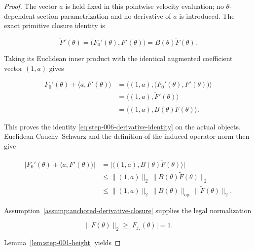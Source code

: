 \begin{proof}
The vector \(a\) is held fixed in this pointwise velocity evaluation; no
\(\theta\)-dependent section parametrization and no derivative of \(a\) is introduced. The exact primitive
closure identity is

\begin{equation}
\label{eq:appendix-display-186}
\widetilde F'(\theta)
=\bigl(F_0'(\theta),F'(\theta)\bigr)
=B(\theta)\widetilde F(\theta).
\end{equation}

Taking its Euclidean inner product with the identical augmented coefficient vector \((1,a)\) gives

\begin{equation}
\label{eq:appendix-display-187}
\begin{aligned}
F_0'(\theta)+\langle a,F'(\theta)\rangle
&=\langle(1,a),\bigl(F_0'(\theta),F'(\theta)\bigr)\rangle\\
&=\langle(1,a),\widetilde F'(\theta)\rangle\\
&=\langle(1,a),B(\theta)\widetilde F(\theta)\rangle.
\end{aligned}
\end{equation}

This proves the identity \eqref{eq:step-006-derivative-identity} on the
actual objects. Euclidean Cauchy--Schwarz and the definition of
the induced operator norm then give

\begin{equation}
\begin{aligned}
\lvert F_0'(\theta)+\langle a,F'(\theta)\rangle\rvert
&=\lvert\langle(1,a),B(\theta)\widetilde F(\theta)\rangle\rvert\\
&\leq\lVert(1,a)\rVert_2\,
       \lVert B(\theta)\widetilde F(\theta)\rVert_2\\
&\leq\lVert(1,a)\rVert_2\,
       \lVert B(\theta)\rVert_{\mathrm{op}}\,
       \lVert\widetilde F(\theta)\rVert_2.
\end{aligned}
\label{eq:step-006-operator-chain}
\end{equation}

Assumption~\ref{assump:anchored-derivative-closure} supplies the legal normalization

\begin{equation}
\lVert F(\theta)\rVert_2\geq\lvert F_{j_*}(\theta)\rvert=1.
\label{eq:step-006-anchor-normalization}
\end{equation}

Lemma~\ref{lem:step-001-height} yields


\end{proof}

